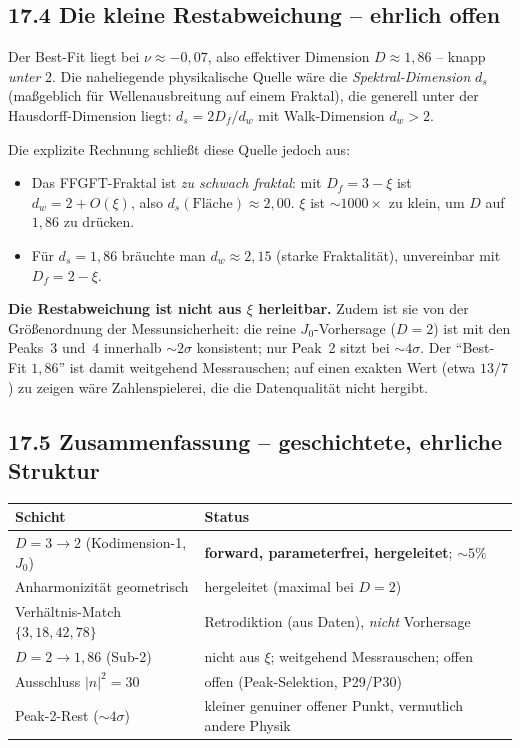 \subsection*{17.4 Die kleine Restabweichung -- ehrlich offen}

Der Best-Fit liegt bei $\nu\approx-0{,}07$, also effektiver Dimension
$D\approx1{,}86$ -- knapp \emph{unter} 2. Die naheliegende physikalische
Quelle wäre die \emph{Spektral-Dimension} $d_s$ (maßgeblich für
Wellenausbreitung auf einem Fraktal), die generell unter der
Hausdorff-Dimension liegt: $d_s = 2D_f/d_w$ mit Walk-Dimension $d_w>2$.

Die explizite Rechnung schließt diese Quelle jedoch aus:
\begin{itemize}
  \item Das FFGFT-Fraktal ist \emph{zu schwach fraktal}: mit
        $D_f=3-\xi$ ist $d_w = 2+O(\xi)$, also $d_s(\text{Fläche})\approx2{,}00$.
        $\xi$ ist $\sim1000\times$ zu klein, um $D$ auf $1{,}86$ zu drücken.
  \item Für $d_s=1{,}86$ bräuchte man $d_w\approx2{,}15$ (starke
        Fraktalität), unvereinbar mit $D_f=2-\xi$.
\end{itemize}
\textbf{Die Restabweichung ist nicht aus $\xi$ herleitbar.} Zudem ist sie
von der Größenordnung der Messunsicherheit: die reine $J_0$-Vorhersage
($D=2$) ist mit den Peaks~3 und~4 innerhalb $\sim2\sigma$ konsistent; nur
Peak~2 sitzt bei $\sim4\sigma$. Der ``Best-Fit $1{,}86$'' ist damit
weitgehend Messrauschen; auf einen exakten Wert (etwa $13/7$) zu zeigen
wäre Zahlenspielerei, die die Datenqualität nicht hergibt.

\subsection*{17.5 Zusammenfassung -- geschichtete, ehrliche Struktur}

\begin{center}
\begin{tabular}{p{5.5cm}p{6.5cm}}
\toprule
\textbf{Schicht} & \textbf{Status} \\
\midrule
$D=3\to2$ (Kodimension-1, $J_0$) &
  \textbf{forward, parameterfrei, hergeleitet}; $\sim5\%$ \\
Anharmonizität geometrisch &
  hergeleitet (maximal bei $D=2$) \\
Verhältnis-Match $\{3,18,42,78\}$ &
  Retrodiktion (aus Daten), \emph{nicht} Vorhersage \\
$D=2\to1{,}86$ (Sub-2) &
  nicht aus $\xi$; weitgehend Messrauschen; offen \\
Ausschluss $|n|^2=30$ &
  offen (Peak-Selektion, P29/P30) \\
Peak-2-Rest ($\sim4\sigma$) &
  kleiner genuiner offener Punkt, vermutlich andere Physik \\
\bottomrule
\end{tabular}
\end{center}

